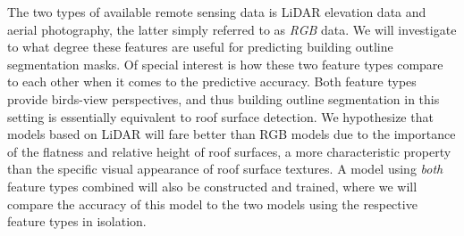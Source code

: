 The two types of available remote sensing data is LiDAR elevation data and aerial photography, the latter simply referred to as \textit{RGB} data.
We will investigate to what degree these features are useful for predicting building outline segmentation masks.
Of special interest is how these two feature types compare to each other when it comes to the predictive accuracy.
Both feature types provide birds-view perspectives, and thus building outline segmentation in this setting is essentially equivalent to roof surface detection.
We hypothesize that models based on LiDAR will fare better than RGB models due to the importance of the flatness and relative height of roof surfaces, a more characteristic property than the specific visual appearance of roof surface textures.
A model using \textit{both} feature types combined will also be constructed and trained, where we will compare the accuracy of this model to the two models using the respective feature types in isolation.
